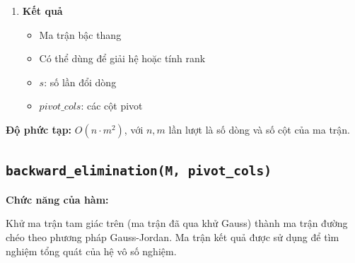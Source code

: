 \documentclass[a4paper,12pt]{report}
\begin{document}
\begin{enumerate}
\begin{lstlisting}[language=Python, caption={Chọn pivot}]
pivot_cols.append(k)
\end{lstlisting}

Hoán đổi dòng:

\begin{lstlisting}[language=Python, caption={Hoán đổi dòng}]
M[pivot_row], M[p] = M[p], M[pivot_row]

if p != pivot_row:
    s += 1
\end{lstlisting}

Khử Gauss:

\begin{itemize}
    \item Tính hệ số:
    \[
    \text{factor} = \frac{M[i][k]}{M[pivot\_row][k]}
    \]

    \item Cập nhật dòng:
\end{itemize}

\begin{lstlisting}[language=Python, caption={Khử Gauss}]
for i in range(pivot_row + 1, n):
    factor = M[i][k] / M[pivot_row][k]
    M[i] = M[i] - factor * M[pivot_row]
    M[i][k] = 0
\end{lstlisting}

\item \textbf{Kết quả}

\begin{itemize}
    \item Ma trận bậc thang
    \item Có thể dùng để giải hệ hoặc tính rank
    \item $s$: số lần đổi dòng
    \item $pivot\_cols$: các cột pivot
\end{itemize}
\end{enumerate}

\noindent\textbf{Độ phức tạp:} $O(n \cdot m^2)$, với $n, m$ lần lượt là số dòng và số cột của ma trận.

\subsection[backward\_elimination(M, pivot\_cols)]{\texttt{backward\_elimination(M, pivot\_cols)}}

\textbf{Chức năng của hàm:}

Khử ma trận tam giác trên (ma trận đã qua khử Gauss) thành ma trận đường chéo theo phương pháp Gauss-Jordan. Ma trận kết quả được sử dụng để tìm nghiệm tổng quát của hệ vô số nghiệm.
\end{document}
